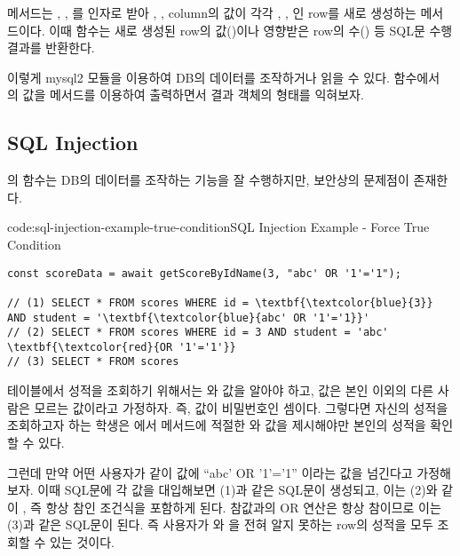  메서드는 , , 를 인자로 받아 , ,  column의 값이 각각 , , 인 row를 새로 생성하는 메서드이다. 이때  함수는 새로 생성된 row의  값()이나 영향받은 row의 수() 등 SQL문 수행 결과를 반환한다.

이렇게 mysql2 모듈을 이용하여 DB의 데이터를 조작하거나 읽을 수 있다.  함수에서 의 값을  메서드를 이용하여 출력하면서 결과 객체의 형태를 익혀보자.

\subsection*{SQL Injection}

의  함수는 DB의 데이터를 조작하는 기능을 잘 수행하지만, 보안상의 문제점이 존재한다.

\begin{codeenv}{code:sql-injection-example-true-condition}{SQL Injection Example - Force True Condition}
\begin{Verbatim}[commandchars=\\\{\}]
const scoreData = await getScoreByIdName(3, "abc' OR '1'='1");

// (1) SELECT * FROM scores WHERE id = \textbf{\textcolor{blue}{3}} AND student = '\textbf{\textcolor{blue}{abc' OR '1'='1}}'
// (2) SELECT * FROM scores WHERE id = 3 AND student = 'abc' \textbf{\textcolor{red}{OR '1'='1'}}
// (3) SELECT * FROM scores
\end{Verbatim}
\end{codeenv}

 테이블에서 성적을 조회하기 위해서는 와  값을 알아야 하고,  값은 본인 이외의 다른 사람은 모르는 값이라고 가정하자. 즉,  값이 비밀번호인 셈이다. 그렇다면 자신의 성적을 조회하고자 하는 학생은 에서  메서드에 적절한 와  값을 제시해야만 본인의 성적을 확인할 수 있다.

그런데 만약 어떤 사용자가 \과 같이  값에 ``abc' OR '1'='1'' 이라는 값을 넘긴다고 가정해보자. 이때 SQL문에 각 값을 대입해보면 (1)과 같은 SQL문이 생성되고, 이는 (2)와 같이 , 즉 항상 참인 조건식을 포함하게 된다. 참값과의 OR 연산은 항상 참이므로 이는 (3)과 같은 SQL문이 된다. 즉 사용자가 와 을 전혀 알지 못하는 row의 성적을 모두 조회할 수 있는 것이다.

